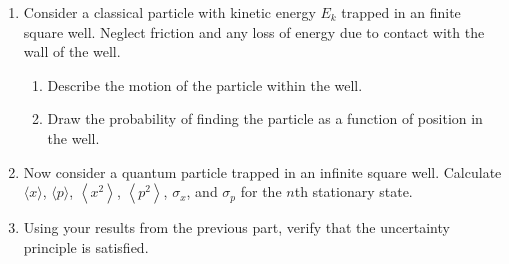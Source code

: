 \documentclass[fleqn, a4paper, 11pt, oneside]{amsart}
\theoremstyle{definition}
\theoremstyle{theorem}
\begin{document}
\begin{question}
	\begin{enumerate}
		\item
			Consider a classical particle with kinetic energy $E_k$ trapped in an finite square well.
			Neglect friction and any loss of energy due to contact with the wall of the well.
			\begin{enumerate}
				\item Describe the motion of the particle within the well.
				\item Draw the probability of finding the particle as a function of position in the well.
			\end{enumerate}
		\item
			Now consider a quantum particle trapped in an infinite square well.
			Calculate $\langle x \rangle$, $\langle p \rangle$, $\left\langle x^2 \right\rangle$, $\left\langle p^2 \right\rangle$, $\sigma_x$, and $\sigma_p$ for the $n$th stationary state.
		\item
			Using your results from the previous part, verify that the uncertainty principle is satisfied.
	\end{enumerate}
\end{question}
\end{document}
